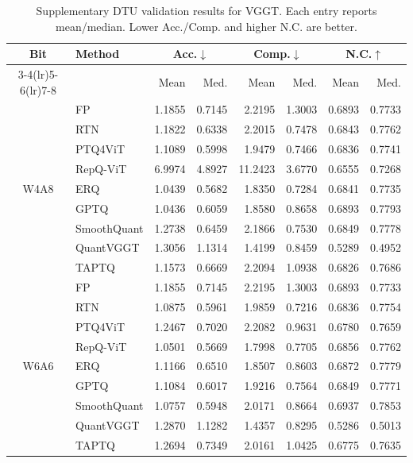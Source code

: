 \documentclass[journal]{Tail_Aware_Post_Training_Quantization_for_3D_Geometry_Models_TMM/IEEEtran}
\newcommand{\taptq}{\textsc{TAPTQ}}
\begin{document}
\begin{table}[t]
\caption{Supplementary DTU validation results for VGGT. Each entry reports mean/median. Lower Acc./Comp. and higher N.C. are better.}
\label{tab:dtu_supplementary}
\centering
\scriptsize
\setlength{\tabcolsep}{3pt}
\begin{tabular}{clrrrrrr}
\toprule
Bit & Method & \multicolumn{2}{c}{Acc.$\downarrow$} & \multicolumn{2}{c}{Comp.$\downarrow$} & \multicolumn{2}{c}{N.C.$\uparrow$} \\
\cmidrule(lr){3-4}\cmidrule(lr){5-6}\cmidrule(lr){7-8}
& & Mean & Med. & Mean & Med. & Mean & Med. \\
\midrule
\multirow{9}{*}{W4A8}
& FP & 1.1855 & 0.7145 & 2.2195 & 1.3003 & 0.6893 & 0.7733 \\
& RTN & 1.1822 & 0.6338 & 2.2015 & 0.7478 & 0.6843 & 0.7762 \\
& PTQ4ViT & 1.1089 & 0.5998 & 1.9479 & 0.7466 & 0.6836 & 0.7741 \\
& RepQ-ViT & 6.9974 & 4.8927 & 11.2423 & 3.6770 & 0.6555 & 0.7268 \\
& ERQ & 1.0439 & 0.5682 & 1.8350 & 0.7284 & 0.6841 & 0.7735 \\
& GPTQ & 1.0436 & 0.6059 & 1.8580 & 0.8658 & 0.6893 & 0.7793 \\
& SmoothQuant & 1.2738 & 0.6459 & 2.1866 & 0.7530 & 0.6849 & 0.7778 \\
& QuantVGGT & 1.3056 & 1.1314 & 1.4199 & 0.8459 & 0.5289 & 0.4952 \\
& \taptq{} & 1.1573 & 0.6669 & 2.2094 & 1.0938 & 0.6826 & 0.7686 \\
\midrule
\multirow{9}{*}{W6A6}
& FP & 1.1855 & 0.7145 & 2.2195 & 1.3003 & 0.6893 & 0.7733 \\
& RTN & 1.0875 & 0.5961 & 1.9859 & 0.7216 & 0.6836 & 0.7754 \\
& PTQ4ViT & 1.2467 & 0.7020 & 2.2082 & 0.9631 & 0.6780 & 0.7659 \\
& RepQ-ViT & 1.0501 & 0.5669 & 1.7998 & 0.7705 & 0.6856 & 0.7762 \\
& ERQ & 1.1166 & 0.6510 & 1.8507 & 0.8603 & 0.6872 & 0.7779 \\
& GPTQ & 1.1084 & 0.6017 & 1.9216 & 0.7564 & 0.6849 & 0.7771 \\
& SmoothQuant & 1.0757 & 0.5948 & 2.0171 & 0.8664 & 0.6937 & 0.7853 \\
& QuantVGGT & 1.2870 & 1.1282 & 1.4357 & 0.8295 & 0.5286 & 0.5013 \\
& \taptq{} & 1.2694 & 0.7349 & 2.0161 & 1.0425 & 0.6775 & 0.7635 \\

\end{tabular}
\end{table}
\end{document}
